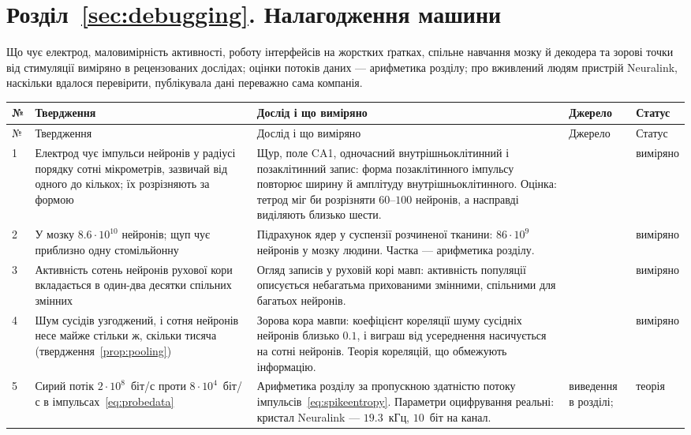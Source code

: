 \section{Розділ~\ref{sec:debugging}. Налагодження машини}

Що чує електрод, маловимірність активності, роботу інтерфейсів на жорстких ґратках, спільне навчання мозку й декодера та зорові точки від стимуляції виміряно в рецензованих дослідах; оцінки потоків даних --- арифметика розділу; про вживлений людям пристрій Neuralink, наскільки вдалося перевірити, публікувала дані переважно сама компанія.

{\footnotesize
\setlength{\tabcolsep}{3pt}\renewcommand{\arraystretch}{1.15}
\begin{longtable}{>{\raggedright}p{0.5cm}>{\raggedright}p{4.0cm}>{\raggedright}p{5.6cm}>{\raggedright}p{2.3cm}>{\raggedright\arraybackslash}p{1.7cm}}
\toprule
№ & Твердження & Дослід і що виміряно & Джерело & Статус \\
\midrule\endfirsthead
\toprule
№ & Твердження & Дослід і що виміряно & Джерело & Статус \\
\midrule\endhead
1 & Електрод чує імпульси нейронів у радіусі порядку сотні мікрометрів, зазвичай від одного до кількох; їх розрізняють за формою & Щур, поле CA1, одночасний внутрішньоклітинний і позаклітинний запис: форма позаклітинного імпульсу повторює ширину й амплітуду внутрішньоклітинного. Оцінка: тетрод міг би розрізняти $60$--$100$ нейронів, а насправді виділяють близько шести. & \cite{Henze2000extra} & виміряно \\
2 & У мозку $8.6\cdot10^{10}$ нейронів; щуп чує приблизно одну стомільйонну & Підрахунок ядер у суспензії розчиненої тканини: $86\cdot10^9$ нейронів у мозку людини. Частка --- арифметика розділу. & \cite{Azevedo2009} & виміряно \\
3 & Активність сотень нейронів рухової кори вкладається в один-два десятки спільних змінних & Огляд записів у руховій корі мавп: активність популяції описується небагатьма прихованими змінними, спільними для багатьох нейронів. & \cite{Gallego2017} & виміряно \\
4 & Шум сусідів узгоджений, і сотня нейронів несе майже стільки ж, скільки тисяча (твердження~\ref{prop:pooling}) & Зорова кора мавпи: коефіцієнт кореляції шуму сусідніх нейронів близько $0.1$, і виграш від усереднення насичується на сотні нейронів. Теорія кореляцій, що обмежують інформацію. & \cite{Zohary1994, MorenoBote2014} & виміряно \\
5 & Сирий потік $2\cdot10^8$~біт/с проти $8\cdot10^4$~біт/с в імпульсах~\eqref{eq:probedata} & Арифметика розділу за пропускною здатністю потоку імпульсів~\eqref{eq:spikeentropy}. Параметри оцифрування реальні: кристал Neuralink --- $19.3$~кГц, $10$~біт на канал. & виведення в розділі; \cite{Rieke1997, Musk2019} & теорія \\

\end{longtable}}
